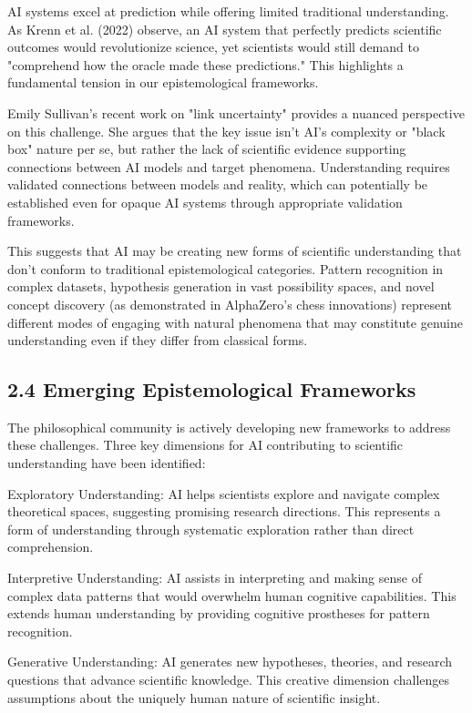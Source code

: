 \documentclass{article}
\begin{document}
AI systems excel at prediction while offering limited traditional understanding. As Krenn et al. (2022) observe, an AI system that perfectly predicts scientific outcomes would revolutionize science, yet scientists would still demand to "comprehend how the oracle made these predictions." This highlights a fundamental tension in our epistemological frameworks.


Emily Sullivan's recent work on "link uncertainty" provides a nuanced perspective on this challenge. She argues that the key issue isn't AI's complexity or "black box" nature per se, but rather the lack of scientific evidence supporting connections between AI models and target phenomena. Understanding requires validated connections between models and reality, which can potentially be established even for opaque AI systems through appropriate validation frameworks.


This suggests that AI may be creating new forms of scientific understanding that don't conform to traditional epistemological categories. Pattern recognition in complex datasets, hypothesis generation in vast possibility spaces, and novel concept discovery (as demonstrated in AlphaZero's chess innovations) represent different modes of engaging with natural phenomena that may constitute genuine understanding even if they differ from classical forms.


\subsection{2.4 Emerging Epistemological Frameworks}

The philosophical community is actively developing new frameworks to address these challenges. Three key dimensions for AI contributing to scientific understanding have been identified:


Exploratory Understanding: AI helps scientists explore and navigate complex theoretical spaces, suggesting promising research directions. This represents a form of understanding through systematic exploration rather than direct comprehension.


Interpretive Understanding: AI assists in interpreting and making sense of complex data patterns that would overwhelm human cognitive capabilities. This extends human understanding by providing cognitive prostheses for pattern recognition.


Generative Understanding: AI generates new hypotheses, theories, and research questions that advance scientific knowledge. This creative dimension challenges assumptions about the uniquely human nature of scientific insight.
\end{document}

